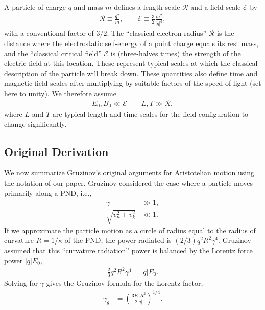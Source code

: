 \documentclass[amsmath,amssymb,nofootinbib,notitlepage,superscriptaddress,twocolumn]{revtex4-2}
\begin{document}
A particle of charge $q$ and mass $m$ defines a length scale $\mathcal{R}$ and a field scale $\mathcal{E}$ by
\begin{align}\label{scales}
    \mathcal{R} \equiv \frac{q^2}{m}, \qquad \mathcal{E} \equiv \frac{3}{2} \frac{m^2}{|q|^3},
\end{align}
with a conventional factor of $3/2$. The ``classical electron radius'' $\mathcal{R}$ is the distance where the electrostatic self-energy of a point charge equals its rest mass, and the ``classical critical field'' $\mathcal{E}$ is (three-halves times) the strength of the electric field at this location.  These represent typical scales at which the classical description of the particle will break down.  These quantities also define time and magnetic field scales after multiplying by suitable factors of the speed of light (set here to unity).  We therefore assume
\begin{align}\label{classicalok}
    E_0,B_0 \ll \mathcal{E} \qquad L,T \gg \mathcal{R},
\end{align}
where $L$ and $T$ are typical length and time scales for the field configuration to change significantly.

\subsection{Original Derivation}\label{sec:original}

We now summarize Gruzinov's original arguments for Aristotelian motion \cite{gruzinov2013b,Gruzinov:2013pva} using the notation of our paper.  Gruzinov considered the case where a particle moves primarily along a PND, i.e.,
\begin{align}
    \gamma & \gg 1, \label{c1} \\
    \sqrt{v_n^2+v_k^2} & \ll 1. \label{c2}
\end{align}
If we approximate the particle motion as a circle of radius equal to the radius of curvature $R=1/\kappa$ of the PND, the power radiated is $(2/3)q^2 R^2 \gamma^4$.  Gruzinov assumed that this ``curvature radiation'' power is balanced by the Lorentz force power $|q| E_0$,
\begin{align}\label{power-balance}
    \frac{2}{3} q^2 R^2 \gamma^4 = |q| E_0.
\end{align}
Solving for $\gamma$ gives the Gruzinov formula for the Lorentz factor,
\begin{align}\label{gruzigamma}
    \gamma_g & = \left( \frac{3E_0 R^2}{2|q|} \right)^{1/4}.
\end{align}
\end{document}
